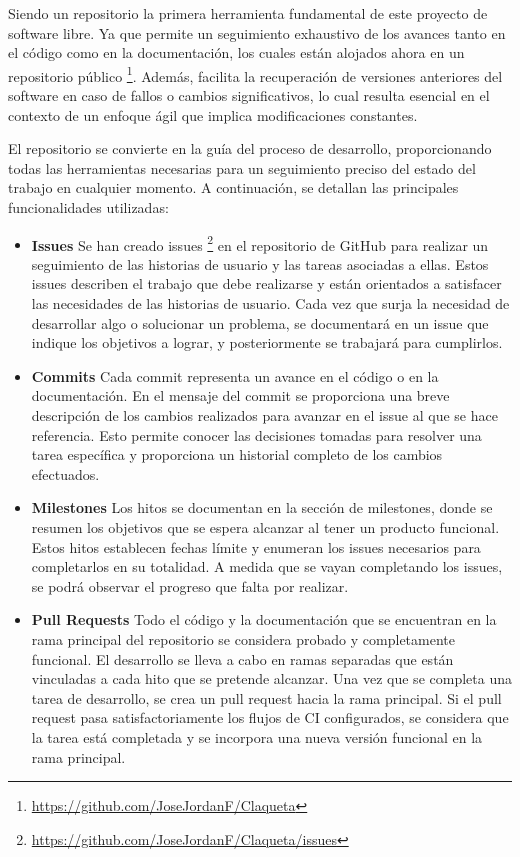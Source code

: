 Siendo un repositorio la primera herramienta fundamental de este proyecto de software libre. Ya que permite un seguimiento exhaustivo de los avances tanto en el código como en la documentación, los cuales están alojados ahora en un repositorio público \footnote{\url{https://github.com/JoseJordanF/Claqueta}}. Además, facilita la recuperación de versiones anteriores del software en caso de fallos o cambios significativos, lo cual resulta esencial en el contexto de un enfoque ágil que implica modificaciones constantes.

El repositorio se convierte en la guía del proceso de desarrollo, proporcionando todas las herramientas necesarias para un seguimiento preciso del estado del trabajo en cualquier momento. A continuación, se detallan las principales funcionalidades utilizadas:

\begin{itemize}
\item \textbf{Issues} Se han creado issues \footnote{\url{https://github.com/JoseJordanF/Claqueta/issues}} en el repositorio de GitHub para realizar un seguimiento de las historias de usuario y las tareas asociadas a ellas. Estos issues describen el trabajo que debe realizarse y están orientados a satisfacer las necesidades de las historias de usuario. Cada vez que surja la necesidad de desarrollar algo o solucionar un problema, se documentará en un issue que indique los objetivos a lograr, y posteriormente se trabajará para cumplirlos.
\item \textbf{Commits} Cada commit representa un avance en el código o en la documentación. En el mensaje del commit se proporciona una breve descripción de los cambios realizados para avanzar en el issue al que se hace referencia. Esto permite conocer las decisiones tomadas para resolver una tarea específica y proporciona un historial completo de los cambios efectuados.
\item \textbf{Milestones} Los hitos se documentan en la sección de milestones, donde se resumen los objetivos que se espera alcanzar al tener un producto funcional. Estos hitos establecen fechas límite y enumeran los issues necesarios para completarlos en su totalidad. A medida que se vayan completando los issues, se podrá observar el progreso que falta por realizar.
\item \textbf{Pull Requests} Todo el código y la documentación que se encuentran en la rama principal del repositorio se considera probado y completamente funcional. El desarrollo se lleva a cabo en ramas separadas que están vinculadas a cada hito que se pretende alcanzar. Una vez que se completa una tarea de desarrollo, se crea un pull request hacia la rama principal. Si el pull request pasa satisfactoriamente los flujos de CI configurados, se considera que la tarea está completada y se incorpora una nueva versión funcional en la rama principal.
\end{itemize}

